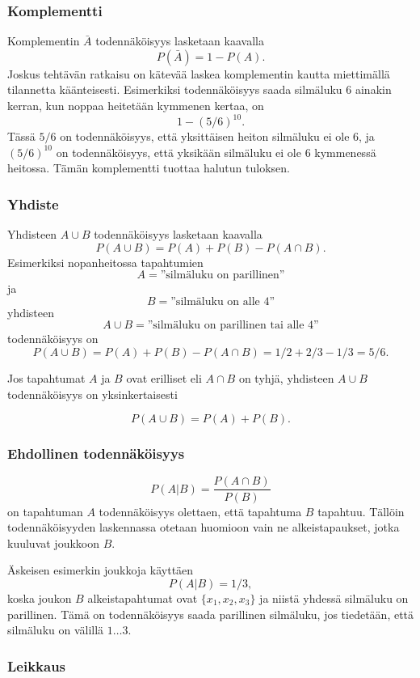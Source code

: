 \subsubsection{Komplementti}

Komplementin $\bar A$
todennäköisyys lasketaan kaavalla
\[P(\bar A)=1-P(A).\]
Joskus tehtävän ratkaisu on kätevää
laskea komplementin kautta
miettimällä tilannetta käänteisesti.
Esimerkiksi todennäköisyys saada
silmäluku 6 ainakin kerran,
kun noppaa heitetään kymmenen kertaa,
on
\[1-(5/6)^{10}.\]
Tässä $5/6$ on todennäköisyys,
että yksittäisen heiton silmäluku ei ole 6,
ja $(5/6)^{10}$ on todennäköisyys, että yksikään
silmäluku ei ole 6 kymmenessä heitossa.
Tämän komplementti tuottaa halutun tuloksen.

\subsubsection{Yhdiste}

Yhdisteen $A \cup B$ todennäköisyys lasketaan kaavalla 
\[P(A \cup B)=P(A)+P(B)-P(A \cap B).\]
Esimerkiksi nopanheitossa tapahtumien
\[A=\textrm{''silmäluku on parillinen''}\]
ja
\[B=\textrm{''silmäluku on alle 4''}\]
yhdisteen
\[A \cup B=\textrm{''silmäluku on parillinen tai alle 4''}\]
todennäköisyys on
\[P(A \cup B) = P(A)+P(B)-P(A \cap B)=1/2+2/3-1/3=5/6.\]

Jos tapahtumat $A$ ja $B$ ovat erilliset eli $A \cap B$ on tyhjä,
yhdisteen $A \cup B$ todennäköisyys on yksinkertaisesti

\[P(A \cup B)=P(A)+P(B).\]

\subsubsection{Ehdollinen todennäköisyys}


\[P(A | B) = \frac{P(A \cap B)}{P(B)}\]
on tapahtuman $A$ todennäköisyys
olettaen, että tapahtuma $B$ tapahtuu.
Tällöin todennäköisyyden laskennassa otetaan
huomioon vain ne alkeistapaukset,
jotka kuuluvat joukkoon $B$.

Äskeisen esimerkin joukkoja käyttäen
\[P(A | B)= 1/3,\]
koska joukon $B$ alkeistapahtumat ovat
$\{x_1,x_2,x_3\}$ ja niistä yhdessä
silmäluku on parillinen.
Tämä on todennäköisyys saada parillinen silmäluku,
jos tiedetään, että silmäluku on välillä $1 \ldots 3$.

\subsubsection{Leikkaus}

